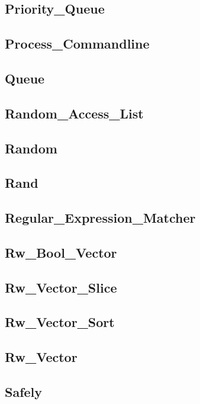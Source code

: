 \subsection{Priority\_Queue}				
\subsection{Process\_Commandline}			
\subsection{Queue}					
\subsection{Random\_Access\_List}			
\subsection{Random}					
\subsection{Rand}					
\subsection{Regular\_Expression\_Matcher}		
\subsection{Rw\_Bool\_Vector}				
\subsection{Rw\_Vector\_Slice}				
\subsection{Rw\_Vector\_Sort}				
\subsection{Rw\_Vector}					
\subsection{Safely}					
